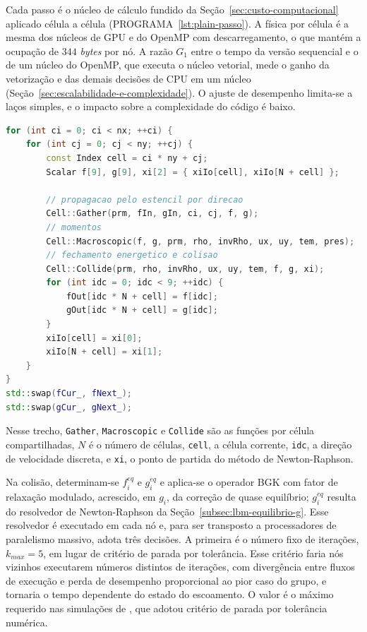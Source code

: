 Cada passo é o núcleo de cálculo fundido da Seção~\ref{sec:custo-computacional} aplicado célula a célula (PROGRAMA~\ref{lst:plain-passo}).
A física por célula é a mesma dos núcleos de GPU e do OpenMP com descarregamento, o que mantém a ocupação de $344$ \textit{bytes} por nó.
A razão $G_1$ entre o tempo da versão sequencial e o de um núcleo do OpenMP, que executa o núcleo vetorial, mede o ganho da vetorização e das demais decisões de CPU em um núcleo (Seção~\ref{sec:escalabilidade-e-complexidade}).
O ajuste de desempenho limita-se a laços simples, e o impacto sobre a complexidade do código é baixo.

\noindent\begin{minipage}{\linewidth}
\begin{lstlisting}[language=C++, caption={Passo fundido da versão sequencial, executado célula a célula.}, label={lst:plain-passo}]
for (int ci = 0; ci < nx; ++ci) {
    for (int cj = 0; cj < ny; ++cj) {
        const Index cell = ci * ny + cj;
        Scalar f[9], g[9], xi[2] = { xiIo[cell], xiIo[N + cell] };

        // propagacao pelo estencil por direcao
        Cell::Gather(prm, fIn, gIn, ci, cj, f, g);
        // momentos
        Cell::Macroscopic(f, g, prm, rho, invRho, ux, uy, tem, pres);
        // fechamento energetico e colisao
        Cell::Collide(prm, rho, invRho, ux, uy, tem, f, g, xi);
        for (int idc = 0; idc < 9; ++idc) {
            fOut[idc * N + cell] = f[idc];
            gOut[idc * N + cell] = g[idc];
        }
        xiIo[cell] = xi[0];
        xiIo[N + cell] = xi[1];
    }
}
std::swap(fCur_, fNext_);
std::swap(gCur_, gNext_);
\end{lstlisting}
\end{minipage}

Nesse trecho, \texttt{Gather}, \texttt{Macroscopic} e \texttt{Collide} são as funções por célula compartilhadas, $N$ é o número de células, \texttt{cell}, a célula corrente, \texttt{idc}, a direção de velocidade discreta, e \texttt{xi}, o ponto de partida do método de Newton-Raphson.

Na colisão, determinam-se $f_i^{eq}$ e $g_i^{eq}$ e aplica-se o operador BGK com fator de relaxação modulado, acrescido, em $g_i$, da correção de quase equilíbrio; $g_i^{eq}$ resulta do resolvedor de Newton-Raphson da Seção~\ref{subsec:lbm-equilibrio-g}.
Esse resolvedor é executado em cada nó e, para ser transposto a processadores de paralelismo massivo, adota três decisões.
A primeira é o número fixo de iterações, $k_{max} = 5$, em lugar de critério de parada por tolerância.
Esse critério faria nós vizinhos executarem números distintos de iterações, com divergência entre fluxos de execução e perda de desempenho proporcional ao pior caso do grupo, e tornaria o tempo dependente do estado do escoamento.
O valor é o máximo requerido nas simulações de \textcite{Rathnayake2024}, que adotou critério de parada por tolerância numérica.

